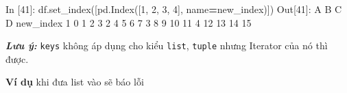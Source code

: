 \documentclass[
]{book}
\makeatletter
\newenvironment{Shaded}{\begin{snugshade}}{\end{snugshade}}
\newcommand{\DecValTok}[1]{\textcolor[rgb]{0.00,0.00,0.81}{#1}}
\newcommand{\NormalTok}[1]{#1}
\newcommand{\OperatorTok}[1]{\textcolor[rgb]{0.81,0.36,0.00}{\textbf{#1}}}
\newcommand{\StringTok}[1]{\textcolor[rgb]{0.31,0.60,0.02}{#1}}
\newenvironment{kframe}{%
\medskip{}
\setlength{\fboxsep}{.8em}
 \def\at@end@of@kframe{}%
 \ifinner\ifhmode%
  \def\at@end@of@kframe{\end{minipage}}%
  \begin{minipage}{\columnwidth}%
 \fi\fi%
 \def\FrameCommand##1{\hskip\@totalleftmargin \hskip-\fboxsep
 \colorbox{shadecolor}{##1}\hskip-\fboxsep
     \hskip-\linewidth \hskip-\@totalleftmargin \hskip\columnwidth}%
 \MakeFramed {\advance\hsize-\width
   \@totalleftmargin\z@ \linewidth\hsize
   \@setminipage}}%
 {\par\unskip\endMakeFramed%
 \at@end@of@kframe}
\newenvironment{rmdblock}[1]
  {
  \begin{itemize}
  \renewcommand{\labelitemi}{
    \raisebox{-.7\height}[0pt][0pt]{
      {\setkeys{Gin}{width=3em,keepaspectratio}\texttt{[image: images/\#1]}}
    }
  }
  \setlength{\fboxsep}{1em}
  \begin{kframe}
  \item
  }
  {
  \end{kframe}
  \end{itemize}
  }
\newenvironment{rmdnote}
  {\begin{rmdblock}{note}}
  {\end{rmdblock}}
\makeatother
\begin{document}
\begin{Shaded}
\begin{Highlighting}[]
\NormalTok{In [}\DecValTok{41}\NormalTok{]: df.set\_index([pd.Index([}\DecValTok{1}\NormalTok{, }\DecValTok{2}\NormalTok{, }\DecValTok{3}\NormalTok{, }\DecValTok{4}\NormalTok{], name}\OperatorTok{=}\StringTok{\textquotesingle{}new\_index\textquotesingle{}}\NormalTok{)])}
\NormalTok{Out[}\DecValTok{41}\NormalTok{]: }
\NormalTok{            A   B   C   D}
\NormalTok{new\_index                }
\DecValTok{1}           \DecValTok{0}   \DecValTok{1}   \DecValTok{2}   \DecValTok{3}
\DecValTok{2}           \DecValTok{4}   \DecValTok{5}   \DecValTok{6}   \DecValTok{7}
\DecValTok{3}           \DecValTok{8}   \DecValTok{9}  \DecValTok{10}  \DecValTok{11}
\DecValTok{4}          \DecValTok{12}  \DecValTok{13}  \DecValTok{14}  \DecValTok{15}
\end{Highlighting}
\end{Shaded}

\begin{rmdnote}
\textbf{\emph{Lưu ý:}}
\texttt{keys} không áp dụng cho kiểu \texttt{list}, \texttt{tuple} nhưng Iterator của nó thì được.
\end{rmdnote}
\textbf{Ví dụ} khi đưa list vào sẽ báo lỗi
\end{document}
